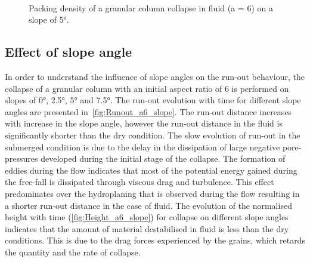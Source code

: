 \documentclass[epj,twocolumn]{webofc}
\begin{document}
\begin{figure}
\\
\caption{Packing density of a granular column collapse in fluid (a = 6) on a 
slope of 5\si{\degree}.}
\label{fig:a6_slope_voro}
\end{figure}

\subsection{Effect of slope angle}
In order to understand the influence of slope angles on the run-out behaviour, 
the collapse of a granular column with an initial aspect ratio of 6 is 
performed on slopes of 0\si{\degree}, 2.5\si{\degree}, 5\si{\degree} and 
7.5\si{\degree}. The run-out evolution with time for different slope angles are 
presented in~\cref{fig:Runout_a6_slope}. The run-out distance increases with 
increase in the slope angle, however the run-out distance in the fluid is 
significantly shorter than the dry condition. The slow evolution of run-out in 
the submerged condition is due to the delay in the dissipation of large 
negative pore-pressures developed during the initial stage of the collapse. The 
formation of eddies during the flow indicates that most of the potential energy 
gained during the free-fall is dissipated through viscous drag and turbulence. 
This effect predominates over the hydroplaning that is observed during 
the flow resulting in a shorter run-out distance in the case of fluid. The 
evolution of the normalised height with time (\cref{fig:Height_a6_slope}) for 
collapse on different slope angles indicates that the 
amount of material destabilised in fluid is less than the dry conditions.
This is due to the drag forces experienced by the grains, which retards the
quantity and the rate of collapse.
\end{document}
